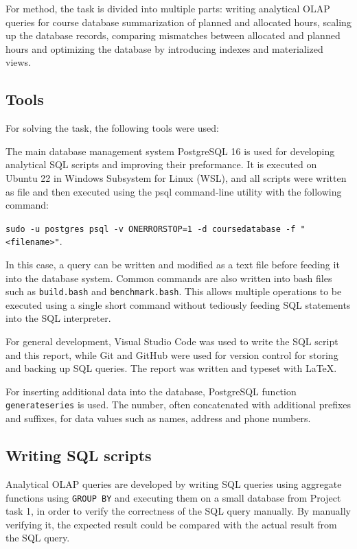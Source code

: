 \documentclass[a4paper]{scrartcl}
\renewcommand{\_}{\textunderscore\allowbreak}
\begin{document}
For method, the task is divided into multiple parts: writing analytical OLAP queries for course database summarization of planned and allocated hours, scaling up the database records, comparing mismatches between allocated and planned hours and optimizing the database by introducing indexes and materialized views.

\subsection{Tools}

For solving the task, the following tools were used:

The main database management system PostgreSQL 16 is used for developing analytical SQL scripts and improving their preformance. It is executed on Ubuntu 22 in Windows Subsystem for Linux (WSL), and all scripts were written as file and then executed using the psql command-line utility with the following command:

\texttt{sudo -u postgres psql -v ON\_ERROR\_STOP=1 -d course\_database -f "<file\_name>"}.

In this case, a query can be written and modified as a text file before feeding it into the database system. Common commands are also written into bash files such as \texttt{build.bash} and \texttt{benchmark.bash}. This allows multiple operations to be executed using a single short command without tediously feeding SQL statements into the SQL interpreter.

For general development, Visual Studio Code was used to write the SQL script and this report, while Git and GitHub were used for version control for storing and backing up SQL queries. The report was written and typeset with \LaTeX.

For inserting additional data into the database, PostgreSQL function \texttt{generate\_series} is used. The number, often concatenated with additional prefixes and suffixes, for data values such as names, address and phone numbers.

\subsection{Writing SQL scripts}

Analytical OLAP queries are developed by writing SQL queries using aggregate functions using \texttt{GROUP BY} and executing them on a small database from Project task 1, in order to verify the correctness of the SQL query manually. By manually verifying it, the expected result could be compared with the actual result from the SQL query.
\end{document}
